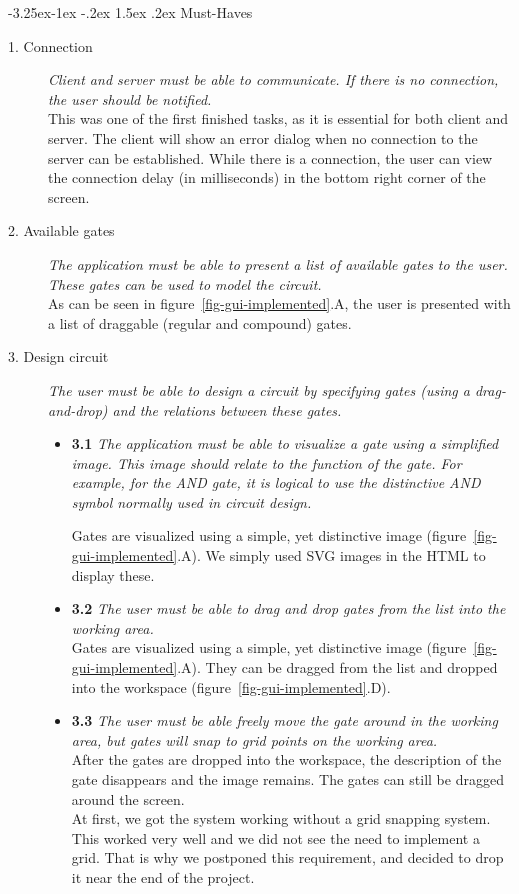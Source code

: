 \documentclass[a4paper]{article}
\makeatletter
\renewcommand\paragraph{\@startsection{paragraph}{4}{\z@}%
  {-3.25ex\@plus -1ex \@minus -.2ex}%
  {1.5ex \@plus .2ex}%
  {\normalfont\normalsize\bfseries}}
\makeatother
\begin{document}
\paragraph{Must-Haves}
\begin{description}
\item[1. Connection] \textit{Client and server must be able to communicate. If there is no connection, the user should be notified.}\\
This was one of the first finished tasks, as it is essential for both client and server. The client will show an error dialog when no connection to the server can be established. While there is a connection, the user can view the connection delay (in milliseconds) in the bottom right corner of the screen.

\item[2. Available gates] \textit{The application must be able to present a list of available gates to the user. These gates can be used to model the circuit.}\\
As can be seen in figure~\ref{fig-gui-implemented}.A, the user is presented with a list of draggable (regular and compound) gates.

\item[3. Design circuit] \textit{The user must be able to design a circuit by specifying gates (using a drag-and-drop) and the relations between these gates.}
	\begin{itemize}
	\item \textbf{3.1} \textit{The application must be able to visualize a gate using a simplified image. This image should relate to the function of the gate. For example, for the AND gate, it is logical to use the distinctive AND symbol normally used in circuit design.}
	
	Gates are visualized using a simple, yet distinctive image (figure~\ref{fig-gui-implemented}.A). We simply used SVG images in the HTML to display these.

	\item \textbf{3.2} \textit{The user must be able to drag and drop gates from the list into the working area.}\\
	Gates are visualized using a simple, yet distinctive image (figure~\ref{fig-gui-implemented}.A). They can be dragged from the list and dropped into the workspace (figure~\ref{fig-gui-implemented}.D).

	\item \textbf{3.3} \textit{The user must be able freely move the gate around in the working area, but gates will snap to grid points on the working area.}\\
	After the gates are dropped into the workspace, the description of the gate disappears and the image remains. The gates can still be dragged around the screen.\\
	At first, we got the system working without a grid snapping system. This worked very well and we did not see the need to implement a grid. That is why we postponed this requirement, and decided to drop it near the end of the project.


\end{itemize}
\end{description}
\end{document}
